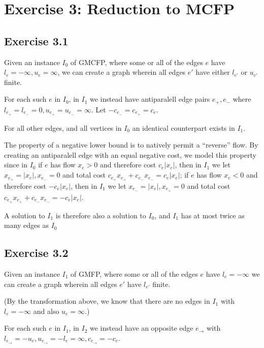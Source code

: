 \section{Exercise 3: Reduction to MCFP}

\subsection{Exercise 3.1}

Given an instance $I_0$ of GMCFP, where some or
all of the edges $e$ have $l_e = -\infty, u_e = \infty$,
we can create a graph wherein all edges $e'$
have either $l_{e'}$ or $u_{e'}$ finite.

For each such $e$ in $I_0$, in $I_1$ we instead have antiparalell edge pairs $e_+, e_-$
where $l_{e_+} = l_{e_-} = 0, u_{e_+} = u_{e_-} = \infty$. Let $-c_{e_-} = c_{e_+} = c_e$.

For all other edges, and all vertices in $I_0$ an identical counterpart exists in $I_1$.

The property of a negative lower bound is to natively permit a ``reverse'' flow. By
creating an antiparalell edge with an equal negative cost, we model this property
since in $I_0$ if $e$ has flow $x_e > 0$ and therefore cost $c_e | x_e |$, then in $I_1$ we let
$x_{e_+} = | x_e |, x_{e_-} = 0$ and total cost $ c_{e_+} x_{e_+} + c_{e_-} x_{e_-} = c_e | x_e |$; if
$e$ has flow $x_e < 0$ and therefore cost $- c_e | x_e |$, then in $I_1$ we let
$x_{e_-} = | x_e |, x_{e_+} = 0$ and total cost $ c_{e_+} x_{e_+} + c_{e_-} x_{e_-} = - c_e | x_e |$.

A solution to $I_1$ is therefore also a solution to $I_0$, and $I_1$ has at
most twice as many edges as $I_0$

\subsection{Exercise 3.2}

Given an instance $I_1$ of GMFP, where some or all of the edges $e$ have
$l_e = -\infty$ we can create a graph wherein all edges $e'$
have $l_{e'}$ finite.

(By the transformation above, we know that there are no edges in $I_1$ with $l_e = -\infty$
and also $u_e = \infty$.)

For each such $e$ in $I_1$, in $I_2$ we instead have an opposite edge $e_{\rightarrow}$
with $l_{e_{\rightarrow}} = -u_{e}, u_{e_{\rightarrow}} = -l_{e} = \infty, c_{e_{\rightarrow}} = -c_e$.

